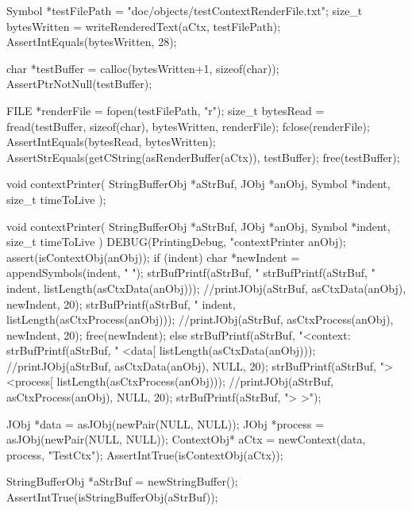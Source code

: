   Symbol *testFilePath = "doc/objects/testContextRenderFile.txt";
  size_t bytesWritten  = writeRenderedText(aCtx, testFilePath);
  AssertIntEquals(bytesWritten, 28);
  
  char *testBuffer = calloc(bytesWritten+1, sizeof(char));
  AssertPtrNotNull(testBuffer);
  
  FILE *renderFile = fopen(testFilePath, "r");
  size_t bytesRead = fread(testBuffer, sizeof(char), bytesWritten, renderFile);
  fclose(renderFile);
  AssertIntEquals(bytesRead, bytesWritten);
  AssertStrEquals(getCString(asRenderBuffer(aCtx)), testBuffer);
  free(testBuffer);
\stopCTest
\stopTestCase
\stopTestSuite

\startTestSuite[contextPrinter]

\startCHeader
void contextPrinter(
  StringBufferObj *aStrBuf,
  JObj            *anObj,
  Symbol          *indent,
  size_t           timeToLive
);
\stopCHeader

\startCCode
void contextPrinter(
  StringBufferObj *aStrBuf,
  JObj            *anObj,
  Symbol          *indent,
  size_t           timeToLive
) {
  DEBUG(PrintingDebug, "contextPrinter %
  anObj);
  assert(isContextObj(anObj));
  if (indent) {
    char *newIndent = appendSymbols(indent, "    ");
    strBufPrintf(aStrBuf, "%
    strBufPrintf(aStrBuf, "%
      indent, listLength(asCtxData(anObj)));
    //printJObj(aStrBuf, asCtxData(anObj), newIndent, 20);
    strBufPrintf(aStrBuf, "%
      indent, listLength(asCtxProcess(anObj)));
    //printJObj(aStrBuf, asCtxProcess(anObj), newIndent, 20);
    free(newIndent);
  } else {
    strBufPrintf(aStrBuf, "<context:%
    strBufPrintf(aStrBuf, "  <data[%
      listLength(asCtxData(anObj)));
    //printJObj(aStrBuf, asCtxData(anObj), NULL, 20);
    strBufPrintf(aStrBuf, "> <process[%
      listLength(asCtxProcess(anObj)));
    //printJObj(aStrBuf, asCtxProcess(anObj), NULL, 20);
    strBufPrintf(aStrBuf, "> >");
  }
}
\stopCCode


\startCTest
  JObj *data       = asJObj(newPair(NULL, NULL));
  JObj *process    = asJObj(newPair(NULL, NULL));
  ContextObj* aCtx = newContext(data, process, "TestCtx");
  AssertIntTrue(isContextObj(aCtx));
  
  StringBufferObj *aStrBuf = newStringBuffer();
  AssertIntTrue(isStringBufferObj(aStrBuf));
  
